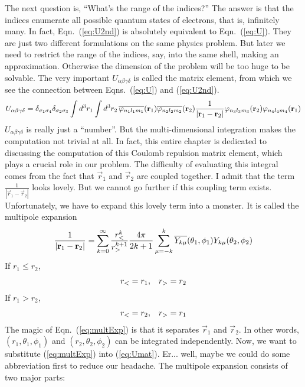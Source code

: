 The next question is, ``What's the range of the indices?'' The answer is that
the indices enumerate all possible quantum states of electrons, that is, infinitely many.
In fact, Eqn.~(\ref{eq:U2nd}) is absolutely equivalent to Eqn.~(\ref{eq:U}).
They are just two different formulations on the same physics problem.
But later we need to restrict the range of the indices,
say, into the same shell, making an approximation.
Otherwise the dimension of the problem will be too huge to be solvable.
The very important $U_{\alpha\beta\gamma\delta}$ is called the matrix element,
from which we see the connection between Eqns.~(\ref{eq:U}) and (\ref{eq:U2nd}).
\begin{equation} \label{eq:Umat}
U_{\alpha\beta\gamma\delta} =
\delta_{\sigma_1\sigma_4} \delta_{\sigma_2\sigma_3} \int d^3r_1 \int d^3r_2 \,
\overline{\varphi_{n_1l_1m_1}}(\mathbf{r}_1) \overline{\varphi_{n_2l_2m_2}}(\mathbf{r}_2)
\frac{1}{|\mathbf{r}_1 - \mathbf{r}_2|}
\varphi_{n_3l_3m_3}(\mathbf{r}_2) \varphi_{n_4l_4m_4}(\mathbf{r}_1)
\end{equation}
%
$U_{\alpha\beta\gamma\delta}$ is really just a ``number''. But the multi-dimensional
integration makes the computation not trivial at all. In fact, this entire chapter
is dedicated to discussing the computation of this Coulomb repulsion matrix element,
which plays a crucial role in our problem. The difficulty of evaluating this integral
comes from the fact that $\vec{r}_1$ and $\vec{r}_2$ are coupled together.
I admit that the term $\frac{1}{|\vec{r}_1 - \vec{r}_2|}$ looks lovely.
But we cannot go further if this coupling term exists. Unfortunately,
we have to expand this lovely term into a monster. It is called the
multipole expansion \cite{YBE}
\begin{equation} \label{eq:multExp}
\frac{1}{|\mathbf{r}_1 - \mathbf{r}_2|} = \sum_{k=0}^\infty \frac{r_<^k}{r_>^{k+1}} \frac{4\pi}{2k+1}
                                    \sum_{\mu=-k}^k \overline{Y_{k\mu}}(\theta_1,\phi_1) Y_{k\mu}(\theta_2,\phi_2)
\end{equation}
If $r_1 \le r_2$,
\begin{equation} \label{eq:r1lr2}
  \begin{array}{c c}
  r_<=r_1, & r_>=r_2
  \end{array}
\end{equation}
If $r_1 > r_2$,
\begin{equation} \label{eq:r1gr2}
  \begin{array}{c c}
  r_<=r_2, & r_>=r_1
  \end{array}
\end{equation}
%
The magic of Eqn.~(\ref{eq:multExp}) is that it separates $\vec{r}_1$ and $\vec{r}_2$.
In other words, $(r_1,\theta_1,\phi_1)$ and $(r_2,\theta_2,\phi_2)$ can be integrated independently.
Now, we want to substitute (\ref{eq:multExp}) into (\ref{eq:Umat}).
Er... well, maybe we could do some abbreviation first to reduce our headache.
The multipole expansion consists of two major parts:

